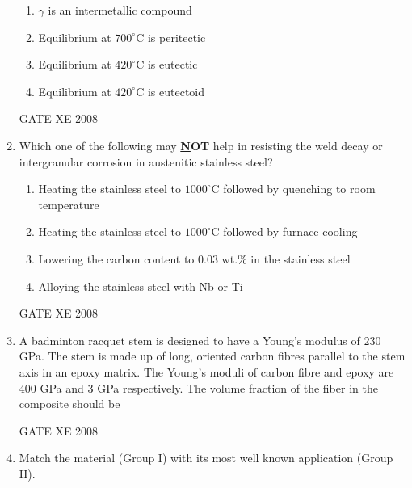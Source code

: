 \documentclass[12pt]{article}
\begin{document}
\begin{enumerate}[label=Q\arabic*.]
\begin{enumerate}[label=(\Alph*)]
\item  $\gamma$ is an intermetallic compound  
\item  Equilibrium at $700^\circ$C is peritectic  
\item  Equilibrium at $420^\circ$C is eutectic  
\item  Equilibrium at $420^\circ$C is eutectoid  
\end{enumerate}

GATE XE 2008

\item Which one of the following may \textbf{\underline NOT} help in resisting the weld decay or intergranular corrosion in austenitic stainless steel?  

\begin{enumerate}[label=(\Alph*)]

\item  Heating the stainless steel to $1000^\circ$C followed by quenching to room temperature  
\item  Heating the stainless steel to $1000^\circ$C followed by furnace cooling 
\item  Lowering the carbon content to $0.03$ wt.\% in the stainless steel  
\item  Alloying the stainless steel with Nb or Ti  
\end{enumerate}

GATE XE 2008

\item A badminton racquet stem is designed to have a Young’s modulus of $230$ GPa. The stem is made up of long, oriented carbon fibres parallel to the stem axis in an epoxy matrix. The Young’s moduli of carbon fibre and epoxy are $400$ GPa and $3$ GPa respectively. The volume fraction of the fiber in the composite should be  

\begin{enumerate}[label=(\Alph*)]
\end{enumerate}

GATE XE 2008


\item Match the material (Group I) with its most well known application (Group II).


\end{enumerate}
\end{document}
